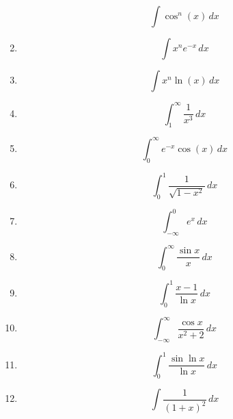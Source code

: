 \documentclass[12pt]{extarticle}
\begin{document}
\begin{enumerate}
\[    \int \cos^n(x) \, dx
    \]
    \item
    \[
    \int x^n e^{-x} \, dx
    \]
    \item
    \[
    \int x^n \ln(x) \, dx
    \]
    \item
    \[
    \int_{1}^{\infty} \frac{1}{x^3} \, dx
    \]
    \item
    \[
    \int_{0}^{\infty} e^{-x} \cos(x) \, dx
    \]
    \item
    \[
    \int_{0}^{1} \frac{1}{\sqrt{1 - x^2}} \, dx
    \]
    \item
    \[
    \int_{-\infty}^{0} e^{x} \, dx
    \]
    \item 
    \[
    \int_{0}^{\infty}\frac{\sin x}{x} \, dx
    \]
    \item 
    \[
    \int_{0}^{1}\frac{x-1}{\ln x} \, dx
    \]
    \item 
    \[
    \int_{-\infty}^{\infty}\frac{\cos x}{x^2+2} \, dx
    \]
    \item 
    \[
    \int_{0}^{1}\frac{\sin{\ln{x}}}{\ln x} \, dx
    \]
    \item 
    \[
    \int\frac{1}{\left(1+x\right)^2} \, dx
    \]    

\end{enumerate}
\end{document}
